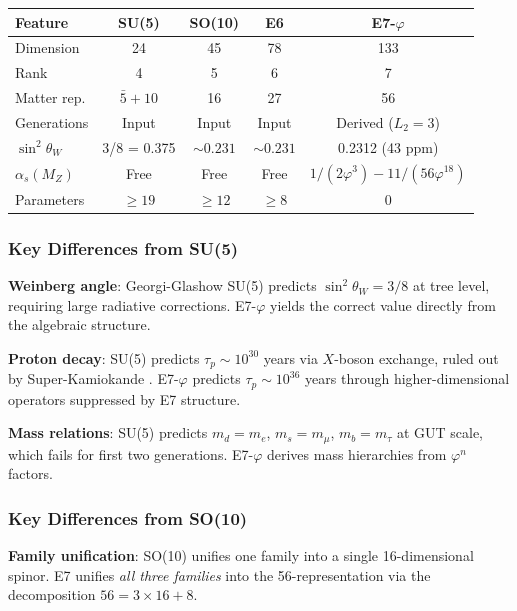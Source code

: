 \documentclass[11pt,a4paper]{article}
\begin{document}
\begin{center}
\begin{tabular}{|l|c|c|c|c|}
\hline
\textbf{Feature} & \textbf{SU(5)} & \textbf{SO(10)} & \textbf{E6} & \textbf{E7-$\varphi$} \\
\hline
Dimension & 24 & 45 & 78 & 133 \\
Rank & 4 & 5 & 6 & 7 \\
Matter rep. & $\bar{5} + 10$ & 16 & 27 & 56 \\
Generations & Input & Input & Input & Derived ($L_2 = 3$) \\
$\sin^2\theta_W$ & 3/8 = 0.375 & $\sim 0.231$ & $\sim 0.231$ & 0.2312 (43 ppm) \\
$\alpha_s(M_Z)$ & Free & Free & Free & $1/(2\varphi^3) - 11/(56\varphi^{18})$ \\
Parameters & $\geq 19$ & $\geq 12$ & $\geq 8$ & 0 \\
\hline
\end{tabular}
\end{center}

\subsubsection{Key Differences from SU(5) \cite{Georgi1974}}

\textbf{Weinberg angle}: Georgi-Glashow SU(5) predicts $\sin^2\theta_W = 3/8$ at tree level, requiring large radiative corrections. E7-$\varphi$ yields the correct value directly from the algebraic structure.

\textbf{Proton decay}: SU(5) predicts $\tau_p \sim 10^{30}$ years via $X$-boson exchange, ruled out by Super-Kamiokande \cite{SuperK2020}. E7-$\varphi$ predicts $\tau_p \sim 10^{36}$ years through higher-dimensional operators suppressed by E7 structure.

\textbf{Mass relations}: SU(5) predicts $m_d = m_e$, $m_s = m_\mu$, $m_b = m_\tau$ at GUT scale, which fails for first two generations. E7-$\varphi$ derives mass hierarchies from $\varphi^n$ factors.

\subsubsection{Key Differences from SO(10)}

\textbf{Family unification}: SO(10) unifies one family into a single 16-dimensional spinor. E7 unifies \emph{all three families} into the 56-representation via the decomposition $56 = 3 \times 16 + 8$.
\end{document}
